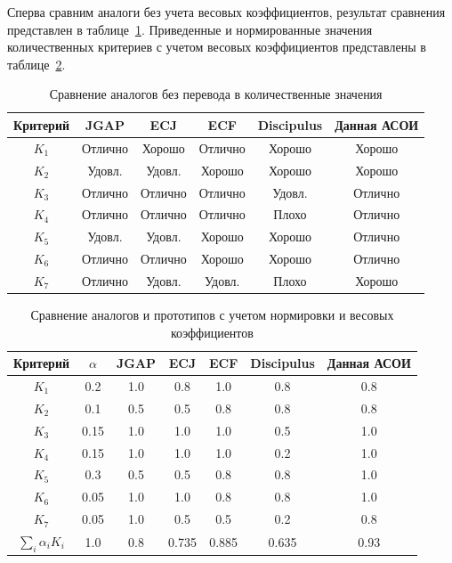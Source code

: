 \documentclass[russian,utf8,emptystyle]{eskdtext}
\begin{document}
\begin{spacing}{1.5}
Сперва сравним аналоги без учета весовых коэффициентов, результат сравнения представлен в таблице~\ref{tab:analog_compare_phase1}. Приведенные и нормированные значения количественных критериев с учетом весовых коэффициентов представлены в таблице~\ref{tab:analog_compare_phase2}.

\begin{table}
\centering
\caption{Сравнение аналогов без перевода в количественные значения}
\label{tab:analog_compare_phase1}
\begin{tabular}{c|c|c|c|c|c}
Критерий & JGAP & ECJ & ECF & Discipulus & Данная АСОИ \\ 
\hline 
$K_1$ & Отлично & Хорошо & Отлично & Хорошо & Хорошо \\ 
\hline 
$K_2$ & Удовл. & Удовл. & Хорошо & Хорошо & Хорошо \\ 
\hline 
$K_3$ & Отлично & Отлично & Отлично & Удовл. & Отлично \\ 
\hline 
$K_4$ & Отлично & Отлично & Отлично & Плохо & Отлично \\ 
\hline 
$K_5$ & Удовл. & Удовл. & Хорошо & Хорошо & Отлично \\ 
\hline 
$K_6$ & Отлично & Отлично & Хорошо & Хорошо & Отлично \\ 
\hline 
$K_7$ & Отлично & Удовл. & Удовл. & Плохо & Хорошо 
\end{tabular} 
\end{table}

\begin{table}
\centering
\caption{Сравнение аналогов и прототипов с учетом нормировки и весовых коэффициентов}
\label{tab:analog_compare_phase2}
\begin{tabular}{c|c|c|c|c|c|c}
Критерий & $\alpha$ & JGAP & ECJ & ECF & Discipulus & Данная АСОИ \\ 
\hline 
$K_1$ & 0.2 & 1.0 & 0.8 & 1.0 & 0.8 & 0.8 \\ 
\hline 
$K_2$ & 0.1 & 0.5 & 0.5 & 0.8 & 0.8 & 0.8 \\ 
\hline 
$K_3$ & 0.15 & 1.0 & 1.0 & 1.0 & 0.5 & 1.0 \\ 
\hline 
$K_4$ & 0.15 & 1.0 & 1.0 & 1.0 & 0.2 & 1.0 \\ 
\hline 
$K_5$ & 0.3 & 0.5 & 0.5 & 0.8 & 0.8 & 1.0 \\ 
\hline 
$K_6$ & 0.05 & 1.0 & 1.0 & 0.8 & 0.8 & 1.0 \\ 
\hline 
$K_7$ & 0.05 & 1.0 & 0.5 & 0.5 & 0.2 & 0.8 \\ 
\hline 
$\sum_i \alpha_i K_i$ & 1.0 & 0.8 & 0.735 & 0.885 & 0.635 & 0.93  
\end{tabular} 
\end{table}


\end{spacing}
\end{document}
